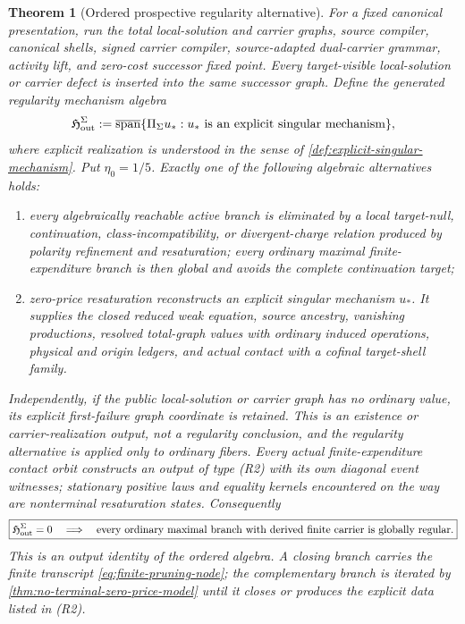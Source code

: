 \documentclass[11pt]{article}
\numberwithin{section}{part}
\theoremstyle{plain}
\newtheorem{theorem}{Theorem}[section]
\theoremstyle{definition}
\theoremstyle{remark}
\begin{document}
\begin{theorem}[Ordered prospective regularity alternative]
\label{thm:structural-bruteforce-regularity}
For a fixed canonical presentation, run the total local-solution and carrier
graphs, source compiler, canonical shells, signed carrier compiler,
source-adapted dual-carrier grammar, activity lift, and zero-cost successor
fixed point.  Every target-visible local-solution or carrier defect is
inserted into the same successor graph.  Define the generated regularity mechanism
algebra
\begin{equation}
 \label{eq:terminal-structural-algebra}
 \mathfrak H_{\rm out}^{\Sigma}
 :=\overline{\operatorname{span}}
 \{\Pi_\Sigma u_\ast:u_\ast\text{ is an explicit singular mechanism}\},
\end{equation}
where explicit realization is understood in the sense of
\cref{def:explicit-singular-mechanism}.  Put \(\eta_0=1/5\).  Exactly
one of the following algebraic alternatives holds:
\begin{enumerate}[label=\textup{(R\arabic*)}]
\item every algebraically reachable active branch is eliminated by a local
  target-null, continuation, class-incompatibility, or divergent-charge
  relation produced by polarity refinement and resaturation; every ordinary
  maximal finite-expenditure branch is then global and avoids the complete
  continuation target;
\item zero-price resaturation reconstructs an explicit singular mechanism
  \(u_\ast\).  It supplies the closed reduced weak equation, source ancestry,
  vanishing productions, resolved total-graph values with ordinary induced
  operations, physical and origin ledgers, and actual contact with a cofinal
  target-shell family.
\end{enumerate}
Independently, if the public local-solution or carrier graph has no ordinary
value, its explicit first-failure graph coordinate is retained.  This is an
existence or carrier-realization output, not a regularity conclusion, and the
regularity alternative is applied only to ordinary fibers.
Every actual finite-expenditure contact orbit constructs an output of type
\textup{(R2)} with its own diagonal event witnesses; stationary positive laws
and equality kernels encountered on the way are nonterminal resaturation
states.  Consequently
\begin{equation}
 \label{eq:terminal-algebra-regularity}
 \boxed{
 \mathfrak H_{\rm out}^{\Sigma}=0
 \quad\Longrightarrow\quad
 \text{every ordinary maximal branch with derived finite carrier is globally
 regular}.}
\end{equation}
This is an output identity of the ordered algebra.  A closing branch carries
the finite transcript \eqref{eq:finite-pruning-node}; the complementary branch
is iterated by \cref{thm:no-terminal-zero-price-model} until it closes or
produces the explicit data listed in \textup{(R2)}.
\end{theorem}
\end{document}
